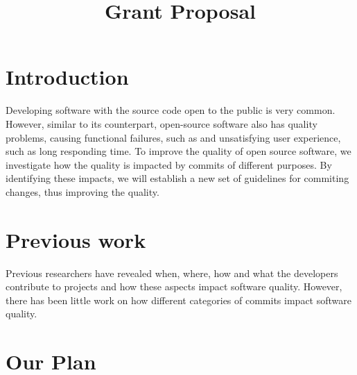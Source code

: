 \documentclass[10pt,conference]{IEEEtran}
\begin{document}
\title{Grant Proposal}

\author{
}

\maketitle


\section{Introduction}

Developing software with the source code open to the public is very common.
However, similar to its counterpart, open-source software also has quality problems, causing functional failures, such as  and unsatisfying user experience, such as long responding time.
To improve the quality of open source software, we investigate how the quality is impacted by commits of different purposes.
By identifying these impacts, we will establish a new set of guidelines for commiting changes, thus improving the quality.

\section{Previous work}

Previous researchers have revealed when, where, how and what the developers contribute to projects and how these aspects impact software quality. 
However, there has been little work on how different categories of commits impact software quality.

\section{Our Plan}
\end{document}

